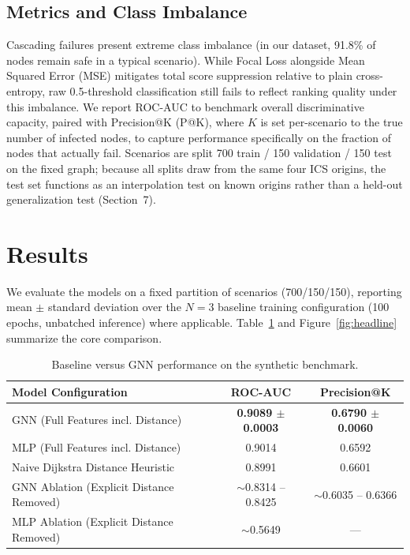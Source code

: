 \documentclass[10pt]{article}
\begin{document}
\subsection{Metrics and Class Imbalance}
Cascading failures present extreme class imbalance (in our dataset, 91.8\% of nodes remain safe in a typical scenario). While Focal Loss alongside Mean Squared Error (MSE) mitigates total score suppression relative to plain cross-entropy, raw 0.5-threshold classification still fails to reflect ranking quality under this imbalance. We report ROC-AUC to benchmark overall discriminative capacity, paired with Precision@K (P@K), where $K$ is set per-scenario to the true number of infected nodes, to capture performance specifically on the fraction of nodes that actually fail. Scenarios are split 700 train / 150 validation / 150 test on the fixed graph; because all splits draw from the same four ICS origins, the test set functions as an interpolation test on known origins rather than a held-out generalization test (Section~7).

\section{Results}
We evaluate the models on a fixed partition of scenarios (700/150/150), reporting mean $\pm$ standard deviation over the $N=3$ baseline training configuration (100 epochs, unbatched inference) where applicable. Table~\ref{tab:main_results} and Figure~\ref{fig:headline} summarize the core comparison.

\begin{table}[ht]
\centering
\small
\caption{Baseline versus GNN performance on the synthetic benchmark.}
\label{tab:main_results}
\begin{tabular}{@{}lcc@{}}
\toprule
\textbf{Model Configuration} & \textbf{ROC-AUC} & \textbf{Precision@K} \\ \midrule
GNN (Full Features incl. Distance) & \textbf{0.9089 $\pm$ 0.0003} & \textbf{0.6790 $\pm$ 0.0060} \\
MLP (Full Features incl. Distance) & 0.9014 & 0.6592 \\
Naive Dijkstra Distance Heuristic & 0.8991 & 0.6601 \\ \midrule
GNN Ablation (Explicit Distance Removed) & $\sim$0.8314 -- 0.8425 & $\sim$0.6035 -- 0.6366 \\
MLP Ablation (Explicit Distance Removed) & $\sim$0.5649 & --- \\ \bottomrule
\end{tabular}
\end{table}
\end{document}
